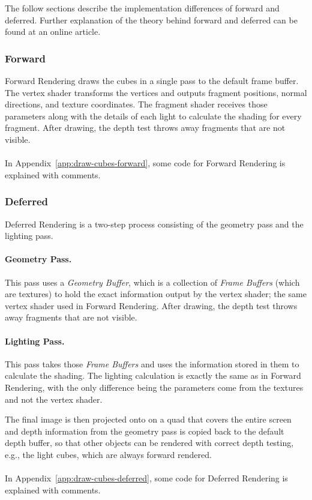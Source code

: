 The follow sections describe the implementation differences of forward and deferred.
Further explanation of the theory behind forward and deferred can be found at an online article\autocite{owens_forward_2013}.

\subsubsection{Forward}
Forward Rendering draws the cubes in a single pass to the default frame buffer.
The vertex shader transforms the vertices and outputs fragment positions, normal directions, and texture coordinates.
The fragment shader receives those parameters along with the details of each light to calculate the shading for every fragment.
After drawing, the depth test throws away fragments that are not visible.
\\
\\
In Appendix~\ref{app:draw-cubes-forward}, some code for Forward Rendering is explained with comments.

\subsubsection{Deferred}
Deferred Rendering is a two-step process consisting of the geometry pass and the lighting pass.

\paragraph{Geometry Pass.}
This pass uses a \emph{Geometry Buffer}, which is a collection of \emph{Frame Buffers} (which are textures) to hold the exact information output by the vertex shader; the same vertex shader used in Forward Rendering.
After drawing, the depth test throws away fragments that are not visible.

\paragraph{Lighting Pass.}
This pass takes those \emph{Frame Buffers} and uses the information stored in them to calculate the shading.
The lighting calculation is exactly the same as in Forward Rendering, with the only difference being the parameters come from the textures and not the vertex shader.

The final image is then projected onto on a quad that covers the entire screen and depth information from the geometry pass is copied back to the default depth buffer, so that other objects can be rendered with correct depth testing, e.g., the light cubes, which are always forward rendered.
\\
\\
In Appendix~\ref{app:draw-cubes-deferred}, some code for Deferred Rendering is explained with comments.

